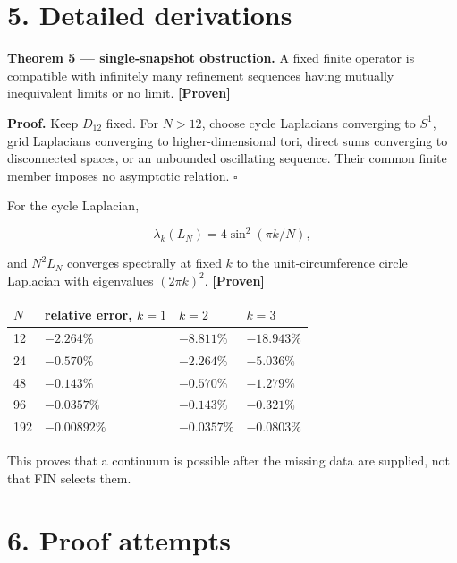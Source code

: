 \documentclass[11pt,a4paper,openany]{report}
\newcommand{\statusProven}{\textcolor{fingreen}{[Proven]}}
\begin{document}
\section{5. Detailed derivations}

\textbf{Theorem 5 — single-snapshot obstruction.} A fixed finite operator is compatible with infinitely many refinement sequences having mutually inequivalent limits or no limit. \textbf{\statusProven{}}

\textbf{Proof.} Keep \(D_{12}\) fixed. For \(N>12\), choose cycle Laplacians converging to \(S^1\), grid Laplacians converging to higher-dimensional tori, direct sums converging to disconnected spaces, or an unbounded oscillating sequence. Their common finite member imposes no asymptotic relation. \(\square\)

For the cycle Laplacian,

\[
\lambda_k(L_N)=4\sin^2(\pi k/N),
\]

and \(N^2L_N\) converges spectrally at fixed \(k\) to the unit-circumference circle Laplacian with eigenvalues \((2\pi k)^2\). \textbf{\statusProven{}}

\begin{center}
\begingroup\small
\setlength{\tabcolsep}{3.5pt}
\renewcommand{\arraystretch}{1.16}
\begin{longtable}{@{}p{}p{}p{}p{}@{}}
\toprule
\textbf{\(N\)} & \textbf{relative error, \(k=1\)} & \textbf{\(k=2\)} & \textbf{\(k=3\)} \\
\midrule
\endhead
12 & \(-2.264\%\) & \(-8.811\%\) & \(-18.943\%\) \\
24 & \(-0.570\%\) & \(-2.264\%\) & \(-5.036\%\) \\
48 & \(-0.143\%\) & \(-0.570\%\) & \(-1.279\%\) \\
96 & \(-0.0357\%\) & \(-0.143\%\) & \(-0.321\%\) \\
192 & \(-0.00892\%\) & \(-0.0357\%\) & \(-0.0803\%\) \\
\bottomrule
\end{longtable}
\endgroup
\end{center}

This proves that a continuum is possible after the missing data are supplied, not that FIN selects them.

\section{6. Proof attempts}
\end{document}
